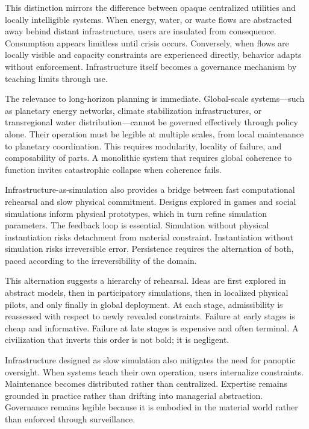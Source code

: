 \documentclass[12pt,oneside]{book}
\begin{document}
This distinction mirrors the difference between opaque centralized utilities and locally intelligible systems. When energy, water, or waste flows are abstracted away behind distant infrastructure, users are insulated from consequence. Consumption appears limitless until crisis occurs. Conversely, when flows are locally visible and capacity constraints are experienced directly, behavior adapts without enforcement. Infrastructure itself becomes a governance mechanism by teaching limits through use.

The relevance to long-horizon planning is immediate. Global-scale systems—such as planetary energy networks, climate stabilization infrastructures, or transregional water distribution—cannot be governed effectively through policy alone. Their operation must be legible at multiple scales, from local maintenance to planetary coordination. This requires modularity, locality of failure, and composability of parts. A monolithic system that requires global coherence to function invites catastrophic collapse when coherence fails.

Infrastructure-as-simulation also provides a bridge between fast computational rehearsal and slow physical commitment. Designs explored in games and social simulations inform physical prototypes, which in turn refine simulation parameters. The feedback loop is essential. Simulation without physical instantiation risks detachment from material constraint. Instantiation without simulation risks irreversible error. Persistence requires the alternation of both, paced according to the irreversibility of the domain.

This alternation suggests a hierarchy of rehearsal. Ideas are first explored in abstract models, then in participatory simulations, then in localized physical pilots, and only finally in global deployment. At each stage, admissibility is reassessed with respect to newly revealed constraints. Failure at early stages is cheap and informative. Failure at late stages is expensive and often terminal. A civilization that inverts this order is not bold; it is negligent.

Infrastructure designed as slow simulation also mitigates the need for panoptic oversight. When systems teach their own operation, users internalize constraints. Maintenance becomes distributed rather than centralized. Expertise remains grounded in practice rather than drifting into managerial abstraction. Governance remains legible because it is embodied in the material world rather than enforced through surveillance.
\end{document}
